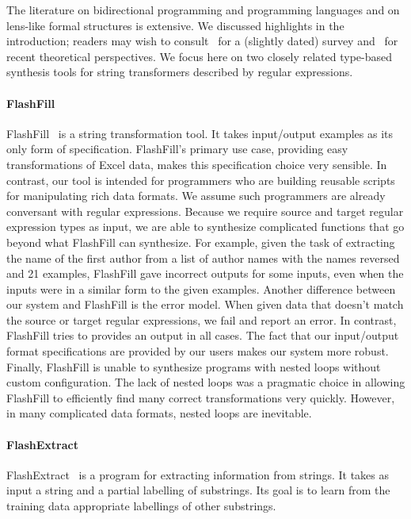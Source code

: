 \documentclass[numbers,10pt,preprint\ifanon ,nocopyrightspace\fi]{sigplanconf}
\begin{document}
The literature on bidirectional programming and programming languages
and on lens-like formal structures is extensive.  We discussed
highlights in the introduction; readers may wish to
consult~\cite{DBLP:conf/icmt/CzarneckiFHLST09} for a (slightly dated)
survey and~\cite{DBLP:journals/chinaf/FischerHP15,
DBLP:conf/birthday/Abou-SalehCGMS16} for recent theoretical
perspectives.
We focus here on two closely related type-based synthesis tools for string
transformers described by regular expressions.

\paragraph*{FlashFill}
FlashFill~\cite{gulwani-popl-2014} is a string transformation
tool.  It takes input/output examples as its only form of
specification.  FlashFill's primary use case,  providing easy
transformations of Excel data, makes this specification choice 
very sensible.  In contrast, our tool is intended for 
programmers who are building reusable scripts for manipulating rich
data formats. We assume such programmers are already conversant with 
regular expressions.
Because we require source and target regular expression types as
input, we are able to synthesize complicated functions that go beyond
what FlashFill can synthesize. 
For example, given the task of extracting the name of the first author
from a list of author names with the names reversed and 21 examples,
FlashFill gave incorrect outputs for some inputs, even when the
inputs were in a similar form to the given examples.
Another difference between our system and FlashFill is the error
model.  When given data that doesn't match the source or target
regular expressions, we fail and report an error.  In contrast,
FlashFill tries to provides an output in all cases.  The fact that our
input/output format specifications are provided by our users makes our
system more robust.
Finally, FlashFill is unable to synthesize programs with nested loops
without custom configuration.  The lack of nested loops was a
pragmatic choice in allowing FlashFill to efficiently find many
correct transformations very quickly.  However, in many complicated
data formats, nested loops are inevitable.

\paragraph*{FlashExtract}
FlashExtract~\cite{le-pldi-2014} is a program for extracting
information from strings.  It takes as input a string and a partial
labelling of substrings.  Its goal is to learn from the training
data appropriate labellings of other substrings.  
\end{document}
